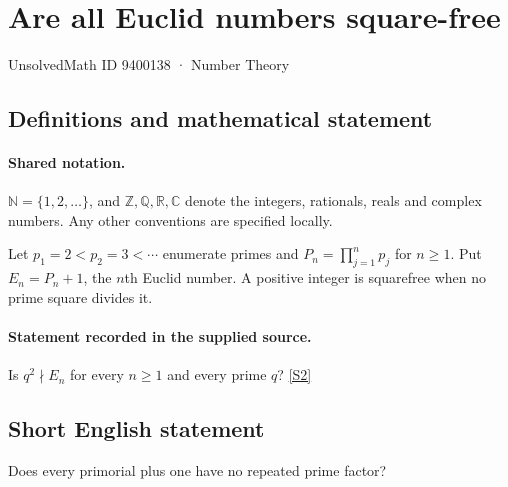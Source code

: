 \documentclass[11pt]{article}
\newcommand{\sref}[2]{\hyperlink{source:#1:#2}{[S#2]}}
\begin{document}
\setcounter{section}{9400137}
\section{Are all Euclid numbers square-free}\label{9400138}
{\small\sffamily UnsolvedMath ID 9400138 · Number Theory}
\subsection{Definitions and mathematical statement}

\paragraph{Shared notation.}$\mathbb N=\{1,2,\ldots\}$, and $\mathbb Z,\mathbb Q,\mathbb R,\mathbb C$ denote the integers, rationals, reals and complex numbers. Any other conventions are specified locally.


Let $p_1=2<p_2=3<\cdots$ enumerate primes and $P_n=\prod_{j=1}^{n}p_j$ for $n\ge1$. Put $E_n=P_n+1$, the $n$th Euclid number. A positive integer is squarefree when no prime square divides it.
\paragraph{Statement recorded in the supplied source.}
Is $q^2\nmid E_n$ for every $n\ge1$ and every prime $q$? \sref{9400138}{2}
\subsection{Short English statement}
Does every primorial plus one have no repeated prime factor?
\end{document}

